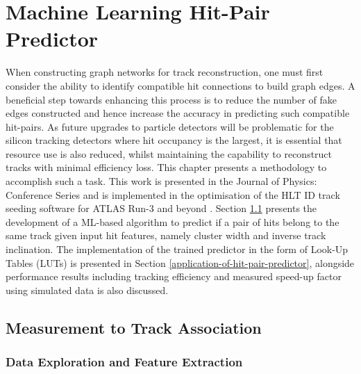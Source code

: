 

\doublespacing
\newpage
\chapter{Machine Learning Hit-Pair Predictor} 
\label{chapter-4}



When constructing graph networks for track reconstruction, one must first consider the ability to identify compatible hit connections to build graph edges. A beneficial step towards enhancing this process is to reduce the number of fake edges constructed and hence increase the accuracy in predicting such compatible hit-pairs. As future upgrades to particle detectors will be problematic for the silicon tracking detectors where hit occupancy is the largest, it is essential that resource use is also reduced, whilst maintaining the capability to reconstruct tracks with minimal efficiency loss. This chapter presents a methodology to accomplish such a task. This work is presented in the Journal of Physics: Conference Series \cite{Lad_2023} and is implemented in the optimisation of the HLT ID track seeding software for ATLAS Run-3 and beyond \cite{Grandi:2728111, Long:2813981}. Section \ref{measurement-to-track-association} presents the development of a ML-based algorithm to predict if a pair of hits belong to the same track given input hit features, namely cluster width and inverse track inclination. The implementation of the trained predictor in the form of Look-Up Tables (LUTs) is presented in Section \ref{application-of-hit-pair-predictor}, alongside performance results including tracking efficiency and measured speed-up factor using simulated data is also discussed.


\section{Measurement to Track Association}
\label{measurement-to-track-association}

\subsection{Data Exploration and Feature Extraction}

